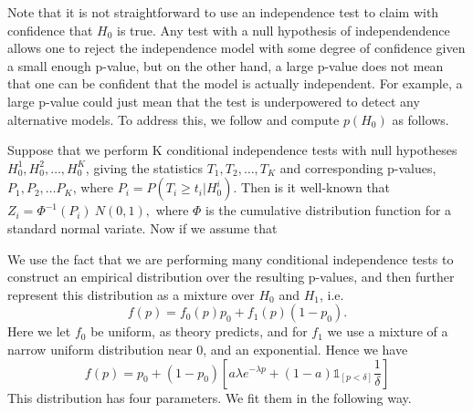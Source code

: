 \documentclass{article} %
\begin{document}
Note that it is not straightforward to use an independence test to claim with confidence that $H_0$ is true.  Any test with a null hypothesis of independendence allows one to reject the independence model with some degree of confidence given a small enough p-value, but on the other hand, a large p-value does not mean that one can be confident that the model is actually independent.  For example, a large p-value could just mean that the test is underpowered to detect any alternative models.  To address this, we follow \cite{efron2004large} and compute $p(H_0)$ as follows.

Suppose that we perform K conditional independence tests with null hypotheses $H_0^1, H_0^2, \ldots, H_0^K$, giving the statistics $T_1, T_2, \ldots, T_K$ and corresponding p-values, $P_1, P_2, \ldots P_K$, where $P_i = P(T_i \geq t_i | H_0^i)$.  Then is it well-known that $Z_i = \Phi^{-1}(P_i) ~ N(0,1),$ where $\Phi$ is the cumulative distribution function for a standard normal variate.  Now if we assume that 

We use the fact that we are performing many conditional independence tests to construct an empirical distribution over the resulting p-values, and then further represent this distribution as a mixture over $H_0$ and $H_1$, i.e. $$f(p) = f_0(p)p_0 + f_1(p)(1 - p_0).$$  Here we let $f_0$ be uniform, as theory predicts, and for $f_1$ we use a mixture of a narrow uniform distribution near 0, and an exponential.  Hence we have $$f(p) = p_0 + (1 - p_0)\left[ a \lambda e^{-\lambda p} + (1 - a) \mathds{1}_{[p < \delta]}\dfrac{1}{\delta} \right] $$  This distribution has four parameters.  We fit them in the following way.  






\begin{small}

%
%

\end{small}
\end{document}
